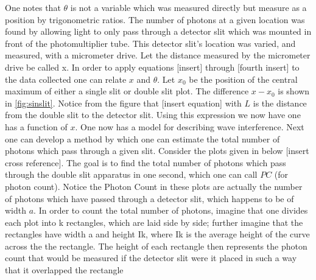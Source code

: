 \documentclass[12pt,twocolumn]{article}
\begin{document}
One notes that $\theta$ is not a variable which was measured directly but measure as a position by trigonometric ratios. The number of photons at a given location was found by allowing light to only pass through a detector slit which was mounted in front of the photomultiplier tube. This detector slit’s location was varied, and measured, with a micrometer drive. Let the distance measured by the
micrometer drive be called x. In order to apply equations [insert] through [fourth insert] to the data collected one can relate $x$ and $\theta$. Let $x_0$ be the position of the central maximum of either a single slit or  double slit plot. The difference $x − x_0$ is shown in \ref{fig:sinslit}. Notice from the figure that [insert equation]
with $L$ is the distance from the double slit to the detector slit. Using this expression we
now have one has a function of $x$. One now has a model for describing wave interference. Next one can develop a method by which one can estimate the total number of photons which pass through a given slit. Consider the plots given in below [insert cross reference]. The goal is to ﬁnd the total number of photons which pass through the double slit apparatus in one second, which one can call $PC$ (for photon count). Notice the Photon Count in these plots are actually the number of photons which have passed through a detector slit, which happens to be of width $a$. In order to count the total number of photons, imagine that one divides each plot into k rectangles, which are laid side by side; further imagine that the rectangles have width a and height Ik, where Ik is the average height of the curve across the the rectangle. The height of each rectangle then represents the photon count that would be measured if the detector slit were it placed in such a way that it overlapped the rectangle
\end{document}
